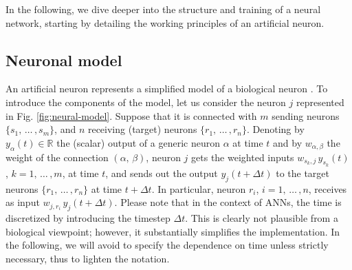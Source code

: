 \documentclass{elsarticle}
\numberwithin{equation}{section}
\theoremstyle{theorem}
\theoremstyle{definition}
\newtheorem{definition}{Definition}[section]
\theoremstyle{remark}
\theoremstyle{proposition}
\numberwithin{figure}{section}
\begin{document}

		
		In the following, we dive deeper into the structure and training of a neural network, starting by detailing the working principles of an artificial neuron.  
		
				
											
	\subsection{Neuronal model}
	\label{section:Neuronal model}
	
		An artificial neuron represents a simplified model of a biological neuron \cite{Kri07}. To introduce the components of the model, let us consider the neuron $j$ represented in Fig. \ref{fig:neural-model}. Suppose that it is connected with $m$ sending neurons $\big\lbrace s_1, \, \ldots \, , s_m \big\rbrace$, and $n$ receiving (target) neurons $\big\lbrace r_1, \, \ldots \, , r_n \big\rbrace$. Denoting by $y_{\alpha}(t) \in \mathbb{R}$ the (scalar) output of a generic neuron $\alpha$ at time $t$ and by $w_{\alpha,\beta}$ the weight of the connection $(\alpha, \, \beta)$, neuron $j$ gets the weighted inputs $w_{s_k,j} \, y_{s_k}(t)$, $k = 1, \, \ldots \, , m$, at time $t$, and sends out the output $y_j(t + \Delta t)$ to the target neurons $\big\lbrace r_1, \, \ldots \, , r_n \big\rbrace$ at time $t + \Delta t$. In particular, neuron $r_i$, $i = 1, \, \ldots \, , n$, receives as input $w_{j,r_i} \, y_j(t + \Delta t)$. Please note that in the context of ANNs, the time is discretized by introducing the timestep $\Delta t$. This is clearly not plausible from a biological viewpoint; however, it substantially simplifies the implementation. In the following, we will avoid to specify the dependence on time unless strictly necessary, thus to lighten the notation.
		
\end{document}
